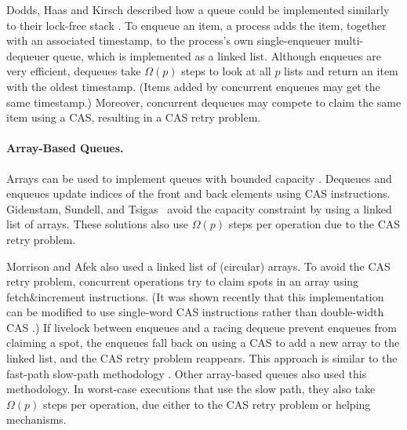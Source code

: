 Dodds, Haas and Kirsch described how a queue could be implemented similarly
to their lock-free stack \cite{DHK15}.  To enqueue an item, a process adds the item, together with an associated timestamp,
to the process's own single-enqueuer multi-dequeuer queue, which is implemented as a linked list.  
Although enqueues are very efficient, dequeues take $\Omega(p)$ steps to look at all $p$ lists
and return an item with the oldest timestamp.
(Items added by concurrent enqueues may get the same timestamp.)
Moreover, concurrent dequeues may compete to claim the same item using a CAS, resulting
in a CAS retry problem.

\paragraph{Array-Based Queues.}
Arrays can be used to implement queues with bounded capacity \cite{DBLP:conf/iceccs/ColvinG05,DBLP:conf/icdcn/Shafiei09,DBLP:conf/spaa/TsigasZ01}.  
Dequeues and enqueues update
indices of the front and back elements using CAS instructions.
Gidenstam, Sundell, and Tsigas~\cite{DBLP:conf/opodis/GidenstamST10} avoid
the capacity constraint by using a linked list of arrays.
These solutions also use $\Omega(p)$ steps per operation due to the CAS retry problem.

Morrison and Afek \cite{DBLP:conf/ppopp/MorrisonA13} also used a linked list of (circular) arrays.
To avoid the CAS retry problem, concurrent operations try to claim spots in an array using fetch\&increment instructions.
(It was shown recently that this implementation can be modified to use single-word CAS instructions rather than double-width CAS \cite{RK23}.)
If livelock between enqueues and a racing dequeue prevent enqueues from claiming a spot,
the enqueues fall back on using a CAS to add a new array to the linked list, 
and the CAS retry problem reappears.
This approach is similar to the fast-path slow-path methodology \cite{10.1145/2370036.2145835}.
Other array-based queues \cite{Nik19,10.1145/3490148.3538572,DBLP:conf/ppopp/YangM16} also used this methodology.
In worst-case executions that use the slow path,
they also take $\Omega(p)$ steps per operation, 
due either to the CAS retry problem or helping mechanisms.

